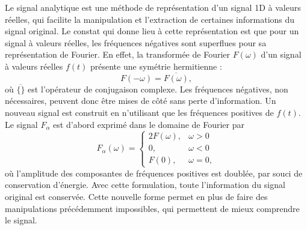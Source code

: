 Le signal analytique est une méthode de représentation d'un signal 1D à valeurs réelles, qui facilite la manipulation et l'extraction de certaines informations du signal original. Le constat qui donne lieu à cette représentation est que pour un signal à valeurs réelles, les fréquences négatives sont superflues pour sa représentation de Fourier. En effet, la transformée de Fourier $F(\omega)$ d'un signal à valeurs réelles $f(t)$ présente une symétrie hermitienne :
\begin{equation}
    F(-\omega) = \overline{F(\omega)},
\end{equation}
où $\overline{\{\}}$ est l'opérateur de conjugaison complexe. Les fréquences négatives, non nécessaires, peuvent donc être mises de côté sans perte d'information. Un nouveau signal est construit en n'utilisant que les fréquences positives de $f(t)$. Le signal $F_{\alpha}$ est d'abord exprimé dans le domaine de Fourier par
\begin{equation}
    F_{\alpha}(\omega) = \left\{
    \begin{array}{ll}
        2F(\omega), & \omega > 0 \\
        0, & \omega < 0 \\
        F(0), & \omega = 0,
    \end{array}
    \right.
\end{equation}
où l'amplitude des composantes de fréquences positives est doublée, par souci de conservation d'énergie. Avec cette formulation, toute l'information du signal original est conservée. Cette nouvelle forme permet en plus de faire des manipulations précédemment impossibles, qui permettent de mieux comprendre le signal.

\bigskip

